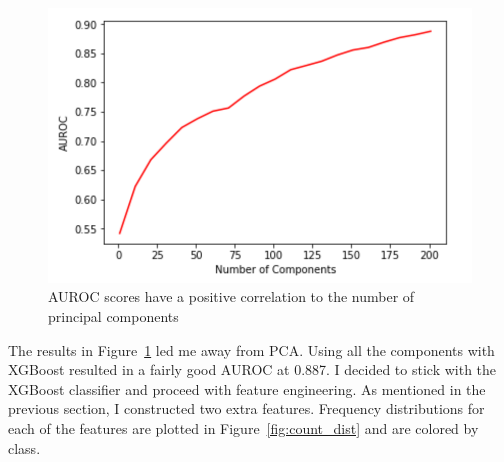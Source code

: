 \documentclass[11pt,letterpaper]{article}
\begin{document}
\begin{figure}[h!]
    \centering
        \includegraphics[width=.5\textwidth]{pca_auc.png}
        \caption{AUROC scores have a positive correlation to the number of
principal components}
        \label{fig:pca_auc}
\end{figure}

The results in Figure~\ref{fig:pca_auc} led me away from PCA.  Using all the components
with XGBoost resulted in a fairly good AUROC at 0.887.  I decided to stick with the
XGBoost classifier and proceed with feature engineering.  As mentioned in the
previous section, I constructed two extra features.  Frequency distributions for
each of the features are plotted in Figure~\ref{fig:count_dist} and are colored by
class.
\end{document}
